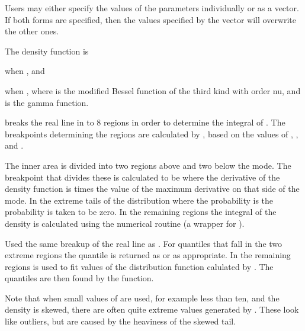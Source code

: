 \begin{Details}\relax
Users may either specify the values of the parameters individually or
as a vector. If both forms are specified, then the values specified by
the vector  will overwrite the other ones.

The density function is


when , and


when ,
where  is the modified Bessel function of the third
kind with order nu, and \eqn{\Gamma}{} is the gamma function.

 breaks the real line in to 8 regions in order to
determine the integral of . The breakpoints determining
the regions are calculated by , based on the
values of , , and .

The inner area is divided into two regions above and two below the
mode. The breakpoint that divides these is calculated to be where the
derivative of the density function is  times the value of
the maximum derivative on that side of the mode. In the extreme tails
of the distribution where the probability is  the
probability is taken to be zero. In the remaining regions the integral
of the density is calculated using the numerical routine
 (a wrapper for
).

 Used the same breakup of the real line as
. For quantiles that fall in the two extreme regions
the quantile is returned as  or  as
appropriate. In the remaining regions  is used to fit
values of the distribution function calulated by . The
quantiles are then found by the  function.

Note that when small values of \eqn{\nu}{} are used, for example
less than ten, and the density is skewed, there are often quite
extreme values generated by . These look like outliers,
but are caused by the heaviness of the skewed tail.
\end{Details}
